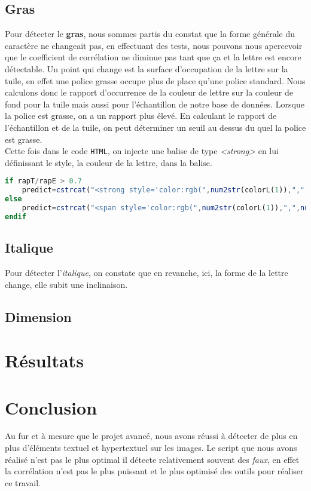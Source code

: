 \documentclass[a4paper,12pt,titlepage]{report}
\begin{document}
	\subsection{Gras}
	Pour détecter le \textbf{gras}, nous sommes partis du constat que la forme générale du caractère ne changeait pas, en effectuant des tests, nous pouvons nous apercevoir que le coefficient de corrélation ne diminue pas tant que ça et la lettre est encore détectable. Un point qui change est la surface d'occupation de la lettre sur la tuile, en effet une police grasse occupe plus de place qu'une police standard. Nous calculons donc le rapport d'occurrence de la couleur de lettre sur la couleur de fond pour la tuile mais aussi pour l'échantillon de notre base de données. Lorsque la police est grasse, on a un rapport plus élevé. En calculant le rapport de l’échantillon et de la tuile, on peut déterminer un seuil au dessus du quel la police est grasse.\\
	Cette fois dans le code \texttt{HTML}, on injecte une balise de type \textsl{<strong>} en lui définissant le style, la couleur de la lettre, dans la balise.
	\begin{lstlisting}[caption={Insertion d'une lettre grasse de la lettre dans Octave},language=Octave]
if rapT/rapE > 0.7
	predict=cstrcat("<strong style='color:rgb(",num2str(colorL(1)),",",num2str(colorL(2)),",",num2str(colorL(3)),");'>",predict,"</strong>");
else
	predict=cstrcat("<span style='color:rgb(",num2str(colorL(1)),",",num2str(colorL(2)),",",num2str(colorL(3)),");'>",predict,"</span>");
endif
\end{lstlisting}
	\subsection{Italique}
	Pour détecter l'\textit{italique}, on constate que en revanche, ici, la forme de la lettre change, elle subit une inclinaison.
	\subsection{Dimension}
	\section{Résultats}
	\section{Conclusion}
	Au fur et à mesure que le projet avancé, nous avons réussi à détecter de plus en plus d'éléments textuel et hypertextuel sur les images.
	Le script que nous avons réalisé n'est pas le plus optimal il détecte relativement souvent des \textit{faux}, en effet la corrélation n'est pas le plus puissant et le plus optimisé des outils pour réaliser ce travail.
	
	\listoffigures
	
	\lstlistoflistings
\end{document}
